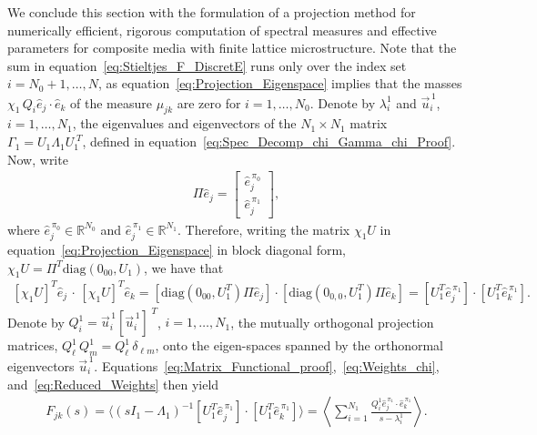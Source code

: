 \documentclass{cmslatex}
\begin{document}
We conclude this section with the formulation of a projection method
for numerically efficient, rigorous computation of spectral
measures and effective parameters for composite media with finite
lattice microstructure. Note that the sum in
equation~\eqref{eq:Stieltjes_F_DiscretE} runs only over the index set 
$i=N_0+1,\ldots,N$, as equation~\eqref{eq:Projection_Eigenspace} implies
that the masses $\chi_1\,Q_i\hat{e}_j\cdot\hat{e}_k$ of the measure $\mu_{jk}$
are zero for $i=1,\ldots,N_0$.  Denote by $\lambda_i^1$ and $\vec{u}_i^{\,1}$,
$i=1,\ldots,N_1$, the eigenvalues and eigenvectors of the $N_1\times N_1$
matrix $\Gamma_1=U_1\Lambda_1U_1^{\;T} $, defined in
equation~\eqref{eq:Spec_Decomp_chi_Gamma_chi_Proof}. Now, write        
%
\begin{align}\label{Pi_coordinates_E}
\Pi\hat{e}_j=
  \left[
  \begin{array}{ccc}
    \hat{e}_j^{\,\pi_0}\\
    \hat{e}_j^{\,\pi_1}
    \end{array}
\right],
\end{align}
%
where $\hat{e}_j^{\,\pi_0}\in\mathbb{R}^{N_0}$ and
$\hat{e}_j^{\,\pi_1}\in\mathbb{R}^{N_1}$. Therefore, writing the
matrix $\chi_1U$ in equation~\eqref{eq:Projection_Eigenspace} in block
diagonal form, $\chi_1U=\Pi^T\text{diag}(0_{00},U_1)$, we have that
%
\begin{align}\label{eq:Reduced_Weights}
  [\chi_1U]^T\hat{e}_j\,\cdot\,[\chi_1U]^T\hat{e}_k=[\text{diag}(0_{00},U_1^T)\Pi\hat{e}_j]
                                    \cdot[\text{diag}(0_{0,0},U_1^T)\Pi\hat{e}_k]
                                   =[U_1^T\hat{e}_j^{\,\pi_1}]
                                   \cdot[U_1^T\hat{e}_k^{\,\pi_1}]. 
\end{align}
%
Denote by $Q^1_i=\vec{u}^{\,1}_i[\vec{u}^{\,1}_i]^{\;T}$, $i=1,\ldots,N_1$,
the mutually orthogonal projection matrices,
$Q^1_\ell\,Q^1_m=Q^1_\ell\,\delta_{\ell m}$, onto the eigen-spaces spanned by the
orthonormal eigenvectors
$\vec{u}^{\,1}_i$. Equations~\eqref{eq:Matrix_Functional_proof},~\eqref{eq:Weights_chi},   
and~\eqref{eq:Reduced_Weights} then yield    
%
\begin{align}\label{eq:Fs_U1}
  F_{jk}(s)=\langle(sI_1-\Lambda_1)^{-1}[U_1^T\hat{e}_j^{\,\pi_1}]
                       \cdot[U_1^T\hat{e}_k^{\,\pi_1}]\rangle
          =\left\langle\sum_{i=1}^{N_1} 
          \frac{Q^1_i\hat{e}_j^{\,\pi_1}\cdot\hat{e}_k^{\,\pi_1}                
              }{s-\lambda_i^1}
              \right\rangle.        
\end{align}
%
\end{document}
